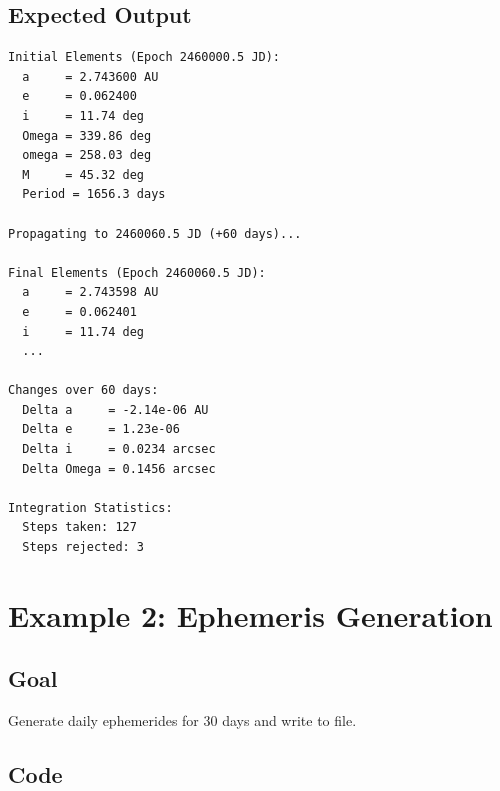 \subsection{Expected Output}

\begin{lstlisting}[style=output]
Initial Elements (Epoch 2460000.5 JD):
  a     = 2.743600 AU
  e     = 0.062400
  i     = 11.74 deg
  Omega = 339.86 deg
  omega = 258.03 deg
  M     = 45.32 deg
  Period = 1656.3 days

Propagating to 2460060.5 JD (+60 days)...

Final Elements (Epoch 2460060.5 JD):
  a     = 2.743598 AU
  e     = 0.062401
  i     = 11.74 deg
  ...

Changes over 60 days:
  Delta a     = -2.14e-06 AU
  Delta e     = 1.23e-06
  Delta i     = 0.0234 arcsec
  Delta Omega = 0.1456 arcsec

Integration Statistics:
  Steps taken: 127
  Steps rejected: 3
\end{lstlisting}

\section{Example 2: Ephemeris Generation}

\subsection{Goal}

Generate daily ephemerides for 30 days and write to file.

\subsection{Code}

